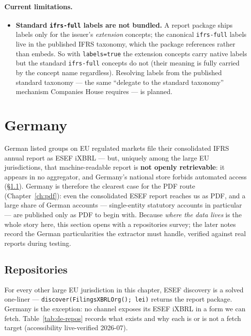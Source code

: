 \documentclass[11pt,a4paper]{report}
\begin{document}
\paragraph{Current limitations.}
\begin{itemize}
  \item \textbf{Standard \texttt{ifrs-full} labels are not bundled.} A report package ships labels only
    for the issuer's \emph{extension} concepts; the canonical \texttt{ifrs-full} labels live in the
    published IFRS taxonomy, which the package references rather than embeds. So with
    \texttt{labels=true} the extension concepts carry native labels but the standard \texttt{ifrs-full}
    concepts do not (their meaning is fully carried by the concept name regardless). Resolving labels
    from the published standard taxonomy --- the same ``delegate to the standard taxonomy'' mechanism
    Companies House requires --- is planned.
\end{itemize}

\section{Germany}
\label{sec:esef-germany}

German listed groups on EU regulated markets file their consolidated IFRS annual report as ESEF iXBRL
--- but, uniquely among the large EU jurisdictions, that machine-readable report is \textbf{not openly
retrievable}: it appears in no aggregator, and Germany's national store forbids automated access
(\S\ref{sec:de-repos}). Germany is therefore the clearest case for the PDF route (Chapter~\ref{ch:pdf}):
even the consolidated ESEF report reaches us as PDF, and a large share of German accounts ---
single-entity statutory accounts in particular --- are published only as PDF to begin with. Because
\emph{where the data lives} is the whole story here, this section opens with a repositories survey; the
later notes record the German particularities the extractor must handle, verified against real reports
during testing.

\subsection{Repositories}\label{sec:de-repos}

For every other large EU jurisdiction in this chapter, ESEF discovery is a solved one-liner ---
\texttt{discover(FilingsXBRLOrg(); lei)} returns the report package. Germany is the exception: no channel
exposes its ESEF iXBRL in a form we can fetch. Table~\ref{tab:de-repos} records what exists and why each is
or is not a fetch target (accessibility live-verified 2026-07).
\end{document}
